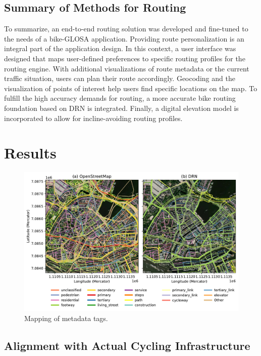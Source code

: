 \subsection{Summary of Methods for Routing}

To summarize, an end-to-end routing solution was developed and fine-tuned to the needs of a bike-GLOSA application. Providing route personalization is an integral part of the application design. In this context, a user interface was designed that maps user-defined preferences to specific routing profiles for the routing engine. With additional visualizations of route metadata or the current traffic situation, users can plan their route accordingly. Geocoding and the visualization of points of interest help users find specific locations on the map. To fulfill the high accuracy demands for routing, a more accurate bike routing foundation based on DRN is integrated. Finally, a digital elevation model is incorporated to allow for incline-avoiding routing profiles.

\section{Results}

\begin{figure}[htbp]
\centering
\includegraphics[width=\linewidth]{images/routing-drn-osm-map.pdf}
\caption{Mapping of metadata tags.}
\label{fig:}
\end{figure}

\subsection{Alignment with Actual Cycling Infrastructure}


